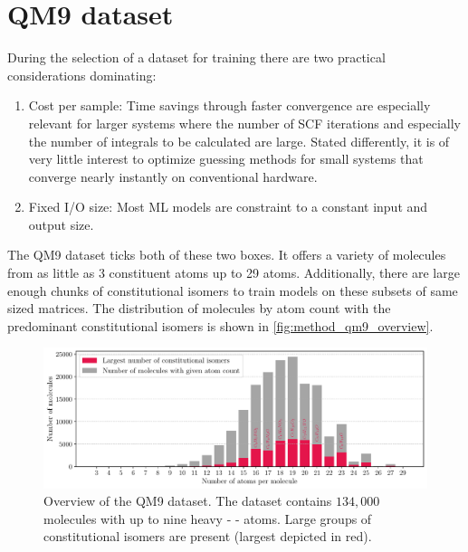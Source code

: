 \section{QM9 dataset}
\label{sec:dataset}
During the selection of a dataset for training there are two practical considerations dominating:
\begin{enumerate}
    \item Cost per sample: Time savings through faster convergence are especially relevant for larger systems where the number of SCF iterations and especially the number of integrals to be calculated are large. Stated differently, it is of very little interest to optimize guessing methods for small systems that converge nearly instantly on conventional hardware. 
    \item Fixed I/O size: Most ML models are constraint to a constant input and output size. 
\end{enumerate}

The QM9 dataset \parencite{ref:data_qm9, ref:article1_qm9,ref:article2_qm9} ticks both of these two boxes. It offers a variety of molecules from as little as 3 constituent atoms up to 29 atoms. Additionally, there are large enough chunks of constitutional isomers to train models on these subsets of same sized matrices. The distribution of molecules by atom count with the predominant constitutional isomers is shown in \autoref{fig:method_qm9_overview}.
\begin{figure}[H]
    \centering
    \includegraphics[width=\textwidth]{../fig/qm9_general/qm9_overview_stacked_bar.pdf}
    \caption[QM9 dataset overview]{Overview of the QM9 dataset. The dataset contains $134,000$ molecules with up to nine heavy -     - atoms. Large groups of constitutional isomers are present (largest depicted in red).}
    \label{fig:method_qm9_overview}
\end{figure}

